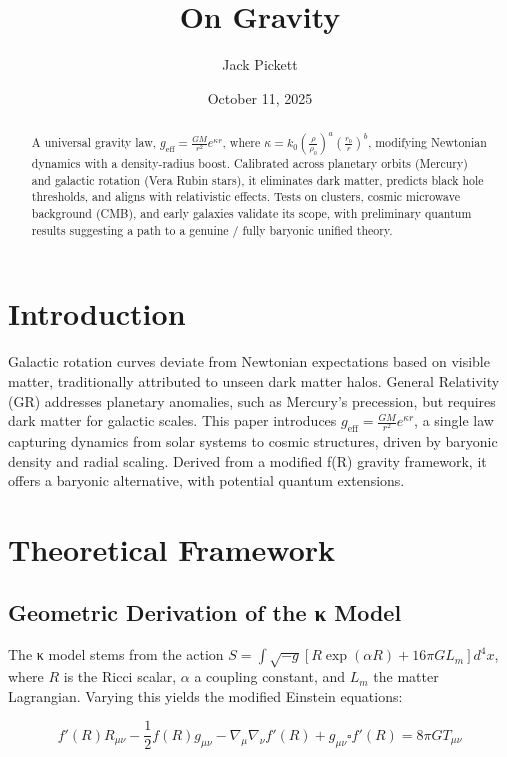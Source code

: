 \documentclass[a4paper,12pt]{article}
\title{On Gravity}
\author{Jack Pickett}
\date{October 11, 2025}
\begin{document}
\maketitle

\begin{abstract}
A universal gravity law, \( g_{\mathrm{eff}} = \frac{G M}{r^2} e^{\kappa r} \), where \( \kappa = k_0 \left( \frac{\rho}{\rho_0} \right)^a \left( \frac{r_0}{r} \right)^b \), modifying Newtonian dynamics with a density-radius boost. Calibrated across planetary orbits (Mercury) and galactic rotation (Vera Rubin stars), it eliminates dark matter, predicts black hole thresholds, and aligns with relativistic effects. Tests on clusters, cosmic microwave background (CMB), and early galaxies validate its scope, with preliminary quantum results suggesting a path to a genuine / fully baryonic unified theory.
\end{abstract}

\section{Introduction}
Galactic rotation curves deviate from Newtonian expectations based on visible matter, traditionally attributed to unseen dark matter halos. General Relativity (GR) addresses planetary anomalies, such as Mercury's precession, but requires dark matter for galactic scales. This paper introduces \( g_{\mathrm{eff}} = \frac{G M}{r^2} e^{\kappa r} \), a single law capturing dynamics from solar systems to cosmic structures, driven by baryonic density and radial scaling. Derived from a modified f(R) gravity framework, it offers a baryonic alternative, with potential quantum extensions.

\section{Theoretical Framework}
\subsection{Geometric Derivation of the κ Model}
The κ model stems from the action \( S = \int \sqrt{-g} \left[ R \exp(\alpha R) + 16\pi G L_m \right] d^4x \), where \( R \) is the Ricci scalar, \( \alpha \) a coupling constant, and \( L_m \) the matter Lagrangian. Varying this yields the modified Einstein equations:

\[ f'(R) R_{\mu\nu} - \frac{1}{2} f(R) g_{\mu\nu} - \nabla_\mu \nabla_\nu f'(R) + g_{\mu\nu} \square f'(R) = 8\pi G T_{\mu\nu} \]
\end{document}
